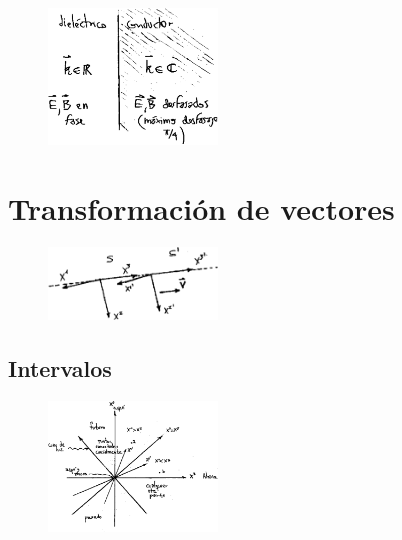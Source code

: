 \documentclass[10pt,oneside]{CBFT_book}
\begin{document}
\begin{figure}[htb]
	\begin{center}
	\includegraphics[width=0.4\textwidth]{images/fig_ft1_conduc4.pdf}	 
	\end{center}
	\caption{}
\end{figure} 

\section{Transformación de vectores}

\begin{figure}[htb]
	\begin{center}
	\includegraphics[width=0.4\textwidth]{images/fig_ft1_transfvec.pdf}	 
	\end{center}
	\caption{}
\end{figure} 


\subsection{Intervalos}

\begin{figure}[htb]
	\begin{center}
	\includegraphics[width=0.4\textwidth]{images/fig_ft1_intervalos.pdf}	 
	\end{center}
	\caption{}
\end{figure} 
\end{document}
